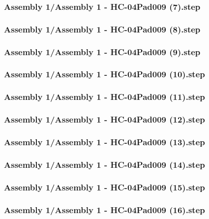 \documentclass[a4paper,12pt]{article}
\begin{document}
\begin{lstlising}[language=C++]
\subsubsection{Assembly 1/Assembly 1 - HC-04Pad009 (7).step}

\subsubsection{Assembly 1/Assembly 1 - HC-04Pad009 (8).step}

\subsubsection{Assembly 1/Assembly 1 - HC-04Pad009 (9).step}

\subsubsection{Assembly 1/Assembly 1 - HC-04Pad009 (10).step}

\subsubsection{Assembly 1/Assembly 1 - HC-04Pad009 (11).step}

\subsubsection{Assembly 1/Assembly 1 - HC-04Pad009 (12).step}

\subsubsection{Assembly 1/Assembly 1 - HC-04Pad009 (13).step}

\subsubsection{Assembly 1/Assembly 1 - HC-04Pad009 (14).step}

\subsubsection{Assembly 1/Assembly 1 - HC-04Pad009 (15).step}

\subsubsection{Assembly 1/Assembly 1 - HC-04Pad009 (16).step}


\end{lstlising}
\end{document}
